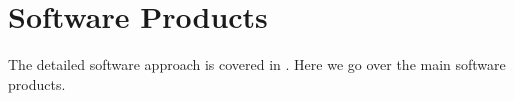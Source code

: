 \section {Software Products} \label{sec:softproduts}
The detailed software approach is covered in \cite{PSTN-019}. Here we go over the main software products.

